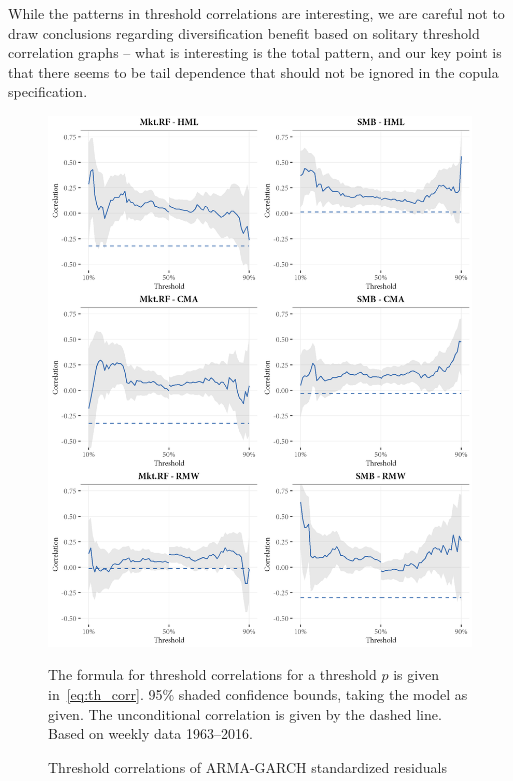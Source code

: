 While the patterns in threshold correlations are interesting, we are careful not to draw conclusions regarding diversification benefit based on solitary threshold correlation graphs -- what is interesting is the total pattern, and our key point is that there seems to be tail dependence that should not be ignored in the copula specification.

\begin{figure}[H]
  \centering
  \includegraphics[scale=1]{graphics/threshold1.png}
  \footnotesize
  \caption{Threshold correlations of ARMA-GARCH standardized residuals}

  \begin{longcaption}
    The formula for threshold correlations for a threshold $p$ is given in~\autoref{eq:th_corr}. 95\% shaded confidence bounds, taking the model as given. The unconditional correlation is given by the dashed line. Based on weekly data 1963--2016.
  \end{longcaption}
  \label{fig:threshold1}
\end{figure}

